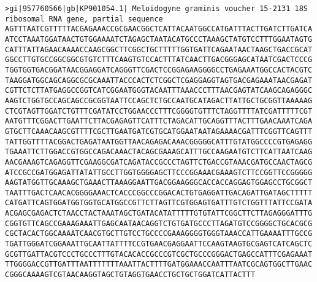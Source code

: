 \documentclass[11pt]{article}
\begin{document}
\begin{Verbatim}[commandchars=\\\{\}]
>gi|957760566|gb|KP901054.1| Meloidogyne graminis voucher 15-2131 18S ribosomal RNA gene, partial sequence
AGTTTAATCGTTTTTACGAGAAACCGCGAACGGCTCATTACAATGGCCATGATTTACTTGATCTTGATCA
ATCCTAAATGGATAACTGTGGAAAATCTAGAGCTAATACATGCCCTAAAGCTATGTCCTTTGGAATAGTG
CATTTATTAGAACAAAACCAAGCGGCTTCGGCTGCTTTTTGGTGATTCAGAATAACTAAGCTGACCGCAT
GGCCTTGTGCCGGCGGCGTGTCTTTCAAGTGTCCACTTTATCAACTTGACGGGAGCATAATCGACTCCCG
TGGTGGTGACGGATAACGGAGGATCAGGGTTCGACTCCGGAGAAGGGGCCTGAGAAATGGCCACTACGTC
TAAGGATGGCAGCAGGCGCGCAAATTACCCACTCTCGGCTCGAGGAGGTAGTGACGAGAAATAACGAGAT
CGTTCTCTTATGAGGCCGGTCATCGGAATGGGTACAATTTAAACCCTTTAACGAGTATCAAGCAGAGGGC
AAGTCTGGTGCCAGCAGCCGCGGTAATTCCAGCTCTGCCAATGCATAGACTTATTGCTGCGGTTAAAAAG
CTCGTAGTTGGATCTGTTTCGATATCCTGGAACCCTTTCGGGGTGTTTCTAGGTTTTATCGATTTTTCGT
AATGTTTCGGACTTGAATTCTTACGAGAGTTCATTTCTAGACATTGCAGGTTTACTTTGAACAAATCAGA
GTGCTTCAAACAAGCGTTTTCGCTTGAATGATCGTGCATGGAATAATAGAAAACGATTTCGGTTCAGTTT
TATTGGTTTTACGGACTGAGATAATGGTTAACAGAGACAAACGGGGGCATTTGTATGGCCCCGTGAGAGG
TGAAATTCTTGGACCGTGGCCAGACAAACTACAGCGAAAGCATTTGCCAAGAATGTCTTCATTAATCAAG
AACGAAAGTCAGAGGTTCGAAGGCGATCAGATACCGCCCTAGTTCTGACCGTAAACGATGCCAACTAGCG
ATCCGCCGATGGAGATTATATTGCCTTGGTGGGGAGCTTCCCGGAAACGAAAGTCTTCCGGTTCCGGGGG
AAGTATGGTTGCAAAGCTGAAACTTAAAGGAATTGACGGAAGGGCACCACCAGGAGTGGAGCCTGCGGCT
TAATTTGACTCAACACGGGGAAACTCACCCGGCCCGGACACTGTGAGGATTGACAGATTGATAGCTTTTT
CATGATTCAGTGGATGGTGGTGCATGGCCGTTCTTAGTTCGTGGAGTGATTTGTCTGGTTTATTCCGATA
ACGAGCGAGACTCTAACCTACTAAATAGCTGATACATATTTTTGTGTATTCGGCTTCTTAGAGGGATTTG
CGGTGTTCAGCCGAAAGAAATTGAGCAATAACAGGTCTGTGATGCCCTTAGATGTCCGGGGCTGCACGCG
CGCTACACTGGCAAAATCAACGTGCTTGTCCTGCCCCGAAAGGGGTGGGTAAACCATTGAAAATTTGCCG
TGATTGGGATCGGAAATTGCAATTATTTTCCGTGAACGAGGAATTCCAAGTAAGTGCGAGTCATCAGCTC
GCGTTGATTACGTCCCTGCCCTTTGTACACACCGCCCGTCGCTGCCCGGGACTGAGCCATTTCGAGAAAT
TTGGGGACCGTTGATTTAATTTTTTTAAATTACTTTTGATGGAAACCAATTTAATCGCAGTGGCTTGAAC
CGGGCAAAAGTCGTAACAAGGTAGCTGTAGGTGAACCTGCTGCTGGATCATTACTTT


\end{Verbatim}
\end{document}

